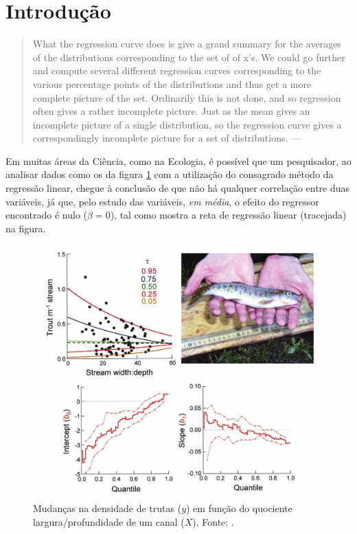 \documentclass[a4paper, 12pt]{article}
\begin{document}
\hypertarget{introducao}{%
\section{Introdução}\label{introducao}}

\begin{quote}
What the regression curve does is give a grand summary for the averages
of the distributions corresponding to the set of of x's. We could go
further and compute several different regression curves corresponding to
the various percentage points of the distributions and thus get a more
complete picture of the set. Ordinarily this is not done, and so
regression often gives a rather incomplete picture. Just as the mean
gives an incomplete picture of a single distribution, so the regression
curve gives a correspondingly incomplete picture for a set of
distributions. \hfill --- \textcite{mosteller1977}
\autocite[apud][19]{koenker2000}
\end{quote}

Em muitas áreas da Ciência, como na Ecologia, é possível que um
pesquisador, ao analisar dados como os da figura \ref{fig:trutas} com a
utilização do consagrado método da regressão linear, chegue à conclusão
de que não há qualquer correlação entre duas variáveis, já que, pelo
estudo das variáveis, \emph{em média}, o efeito do regressor encontrado
é nulo (\(\beta = 0\)), tal como mostra a reta de regressão linear
(tracejada) na figura.

\begin{figure}[H]

{\centering \includegraphics[width=1\linewidth]{images/-000} 

}

\caption{Mudanças na densidade de trutas ($y$) em função do quociente largura/profundidade de um canal ($X$). Fonte: \textcite[413]{QReco}.}\label{fig:trutas}
\end{figure}
\end{document}
